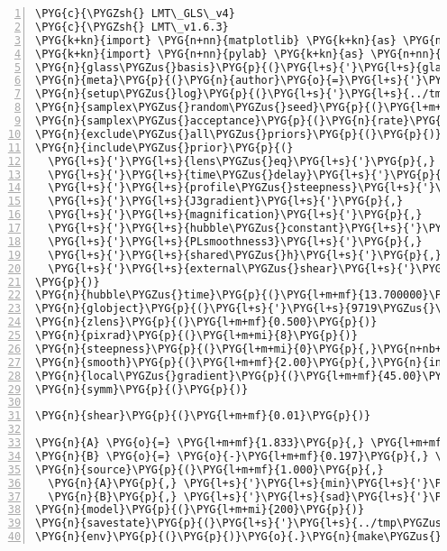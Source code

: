 \begin{Verbatim}[commandchars=\\\{\},numbers=left,stepnumber=1,codes={\catcode`\$=3\catcode`\^=7\catcode`\_=8}]
\PYG{c}{\PYGZsh{} LMT\_GLS\_v4}
\PYG{c}{\PYGZsh{} LMT\_v1.6.3}
\PYG{k+kn}{import} \PYG{n+nn}{matplotlib} \PYG{k+kn}{as} \PYG{n+nn}{mpl}
\PYG{k+kn}{import} \PYG{n+nn}{pylab} \PYG{k+kn}{as} \PYG{n+nn}{pl}
\PYG{n}{glass\PYGZus{}basis}\PYG{p}{(}\PYG{l+s}{'}\PYG{l+s}{glass.basis.pixels}\PYG{l+s}{'}\PYG{p}{,} \PYG{n}{solver}\PYG{o}{=}\PYG{l+s}{'}\PYG{l+s}{rwalk}\PYG{l+s}{'}\PYG{p}{)}
\PYG{n}{meta}\PYG{p}{(}\PYG{n}{author}\PYG{o}{=}\PYG{l+s}{'}\PYG{l+s}{c\PYGZus{}cld}\PYG{l+s}{'}\PYG{p}{,} \PYG{n}{notes}\PYG{o}{=}\PYG{l+s}{'}\PYG{l+s}{using LensModellingTools}\PYG{l+s}{'}\PYG{p}{)}
\PYG{n}{setup\PYGZus{}log}\PYG{p}{(}\PYG{l+s}{'}\PYG{l+s}{../tmp\PYGZus{}media/009719/log.txt}\PYG{l+s}{'}\PYG{p}{)}
\PYG{n}{samplex\PYGZus{}random\PYGZus{}seed}\PYG{p}{(}\PYG{l+m+mi}{0}\PYG{p}{)}
\PYG{n}{samplex\PYGZus{}acceptance}\PYG{p}{(}\PYG{n}{rate}\PYG{o}{=}\PYG{l+m+mf}{0.25}\PYG{p}{,} \PYG{n}{tol}\PYG{o}{=}\PYG{l+m+mf}{0.15}\PYG{p}{)}
\PYG{n}{exclude\PYGZus{}all\PYGZus{}priors}\PYG{p}{(}\PYG{p}{)}
\PYG{n}{include\PYGZus{}prior}\PYG{p}{(}
  \PYG{l+s}{'}\PYG{l+s}{lens\PYGZus{}eq}\PYG{l+s}{'}\PYG{p}{,}
  \PYG{l+s}{'}\PYG{l+s}{time\PYGZus{}delay}\PYG{l+s}{'}\PYG{p}{,}
  \PYG{l+s}{'}\PYG{l+s}{profile\PYGZus{}steepness}\PYG{l+s}{'}\PYG{p}{,}
  \PYG{l+s}{'}\PYG{l+s}{J3gradient}\PYG{l+s}{'}\PYG{p}{,}
  \PYG{l+s}{'}\PYG{l+s}{magnification}\PYG{l+s}{'}\PYG{p}{,}
  \PYG{l+s}{'}\PYG{l+s}{hubble\PYGZus{}constant}\PYG{l+s}{'}\PYG{p}{,}
  \PYG{l+s}{'}\PYG{l+s}{PLsmoothness3}\PYG{l+s}{'}\PYG{p}{,}
  \PYG{l+s}{'}\PYG{l+s}{shared\PYGZus{}h}\PYG{l+s}{'}\PYG{p}{,}
  \PYG{l+s}{'}\PYG{l+s}{external\PYGZus{}shear}\PYG{l+s}{'}\PYG{p}{,}
\PYG{p}{)}
\PYG{n}{hubble\PYGZus{}time}\PYG{p}{(}\PYG{l+m+mf}{13.700000}\PYG{p}{)}
\PYG{n}{globject}\PYG{p}{(}\PYG{l+s}{'}\PYG{l+s}{9719\PYGZus{}\PYGZus{}ASW0007j6j}\PYG{l+s}{'}\PYG{p}{)}
\PYG{n}{zlens}\PYG{p}{(}\PYG{l+m+mf}{0.500}\PYG{p}{)}
\PYG{n}{pixrad}\PYG{p}{(}\PYG{l+m+mi}{8}\PYG{p}{)}
\PYG{n}{steepness}\PYG{p}{(}\PYG{l+m+mi}{0}\PYG{p}{,}\PYG{n+nb+bp}{None}\PYG{p}{)}
\PYG{n}{smooth}\PYG{p}{(}\PYG{l+m+mf}{2.00}\PYG{p}{,}\PYG{n}{include\PYGZus{}central\PYGZus{}pixel}\PYG{o}{=}\PYG{n+nb+bp}{False}\PYG{p}{)}
\PYG{n}{local\PYGZus{}gradient}\PYG{p}{(}\PYG{l+m+mf}{45.00}\PYG{p}{)}
\PYG{n}{symm}\PYG{p}{(}\PYG{p}{)}

\PYG{n}{shear}\PYG{p}{(}\PYG{l+m+mf}{0.01}\PYG{p}{)}

\PYG{n}{A} \PYG{o}{=} \PYG{l+m+mf}{1.833}\PYG{p}{,} \PYG{l+m+mf}{0.733}
\PYG{n}{B} \PYG{o}{=} \PYG{o}{-}\PYG{l+m+mf}{0.197}\PYG{p}{,} \PYG{o}{-}\PYG{l+m+mf}{1.805}
\PYG{n}{source}\PYG{p}{(}\PYG{l+m+mf}{1.000}\PYG{p}{,}
  \PYG{n}{A}\PYG{p}{,} \PYG{l+s}{'}\PYG{l+s}{min}\PYG{l+s}{'}\PYG{p}{,} 
  \PYG{n}{B}\PYG{p}{,} \PYG{l+s}{'}\PYG{l+s}{sad}\PYG{l+s}{'}\PYG{p}{,} \PYG{n+nb+bp}{None}\PYG{p}{)}
\PYG{n}{model}\PYG{p}{(}\PYG{l+m+mi}{200}\PYG{p}{)}
\PYG{n}{savestate}\PYG{p}{(}\PYG{l+s}{'}\PYG{l+s}{../tmp\PYGZus{}media/009719/state.txt}\PYG{l+s}{'}\PYG{p}{)}
\PYG{n}{env}\PYG{p}{(}\PYG{p}{)}\PYG{o}{.}\PYG{n}{make\PYGZus{}ensemble\PYGZus{}average}\PYG{p}{(}\PYG{p}{)}
\end{Verbatim}
